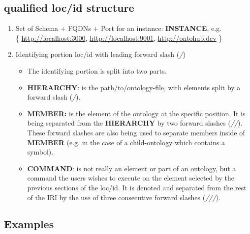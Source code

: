 \documentclass[a4paper,11pt,DIV=22]{scrartcl}
\begin{document}
\subsection{qualified loc/id structure}

\begin{enumerate}
  \item Set of Schema + FQDNs + Port for an instance: \textbf{INSTANCE}, e.g.\\
    \{ \url{http://localhost:3000}, \url{http://localhost:9001}, \url{http://ontohub.dev} \}
  \item Identifying portion loc/id with leading forward slash (\emph{/})
  \begin{itemize}
    \item The identifying portion is split into two parts.
    \item \textbf{HIERARCHY}: is the \url{path/to/ontology-file}, with elements
      split by a forward slash (\emph{/}).
    \item \textbf{MEMBER:} is the element of the ontology at the specific
      position. It is being separated from the \textbf{HIERARCHY} by two
      forward slashes (\emph{//}). These forward slashes are also being used to
      separate members inside of \textbf{MEMBER} (e.g. in the case of a
      child-ontology which contains a symbol).
    \item \textbf{COMMAND}: is not really an element or part of an ontology,
      but a command the users wishes to execute on the element selected by the
      previous sections of the loc/id. It is denoted and separated from the
      rest of the IRI by the use of three consecutive forward slashes
      (\emph{///}).
  \end{itemize}
\end{enumerate}

\subsection{Examples}
\end{document}
